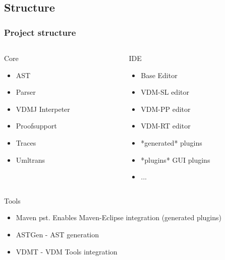 \subsection{Structure}
\frame
{
  \frametitle{Project structure}

\begin{columns}
\begin{column}{5cm}
	\begin{block}{Core}
		\begin{itemize}
			\item AST
			\item Parser
			\item VDMJ Interpeter
			\item Proofsupport
			\item Traces
			\item Umltrans
		\end{itemize}
	 \end{block}
\end{column}
\begin{column}{5cm}
\pause
	\begin{block}{IDE}
		\begin{itemize}
			\item Base Editor
			\item VDM-SL editor
			\item VDM-PP editor
			\item VDM-RT editor
			\item *generated* plugins
			\item *plugins* GUI plugins
			\item ...
		\end{itemize}
		
	\end{block}
\end{column}
\end{columns}
\pause
\begin{block}{Tools}
	\begin{itemize}
		\item Maven pst. Enables Maven-Eclipse integration (generated plugins)
		\item ASTGen - AST generation
		\item VDMT - VDM Tools integration
	\end{itemize}
\end{block}

}


